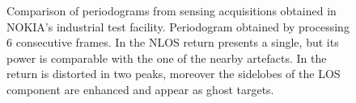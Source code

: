 	\begin{figure}[H]
	\centering
	
	\hfill
	\caption[]{\small Comparison of periodograms from sensing acquisitions obtained in NOKIA's industrial test facility.
		Periodogram obtained by processing 6 consecutive frames.
		In  the NLOS return presents a single, but its power is comparable with the one of the nearby artefacts. In  the return is distorted in two peaks, moreover the sidelobes of the LOS component are enhanced and appear as ghost targets.}
	\label{fig:Test1_huma_crap-ecac}
\end{figure}




